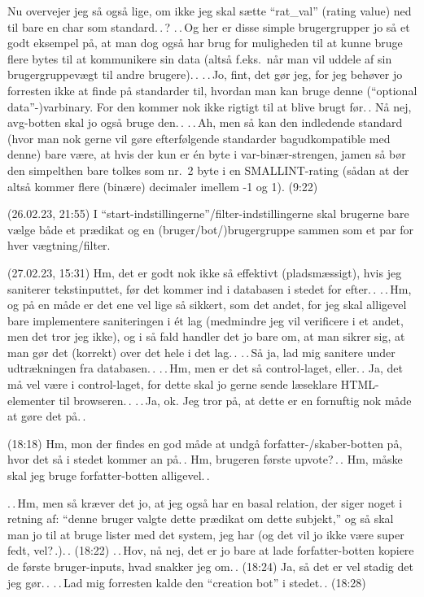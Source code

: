 \documentclass{report}
\begin{document}
Nu overvejer jeg så også lige, om ikke jeg skal sætte ``rat\_val'' (rating value) ned til bare en char som standard.\,.\,? .\,.\,Og her er disse simple brugergrupper jo så et godt eksempel på, at man dog også har brug for muligheden til at kunne bruge flere bytes til at kommunikere sin data (altså f.eks.\ når man vil uddele af sin brugergruppevægt til andre brugere).\,. .\,.\,Jo, fint, det gør jeg, for jeg behøver jo forresten ikke at finde på standarder til, hvordan man kan bruge denne (``optional data''-)varbinary. For den kommer nok ikke rigtigt til at blive brugt før.\,. Nå nej, avg-botten skal jo også bruge den.\,. .\,.\,Ah, men så kan den indledende standard (hvor man nok gerne vil gøre efterfølgende standarder bagudkompatible med denne) bare være, at hvis der kun er én byte i var-binær-strengen, jamen så bør den simpelthen bare tolkes som nr.\ 2 byte i en SMALLINT-rating (sådan at der altså kommer flere (binære) decimaler imellem -1 og 1). (9:22) 

(26.02.23, 21:55) I ``start-indstillingerne''/filter-indstillingerne skal brugerne bare vælge både et prædikat og en (bruger/bot/)brugergruppe sammen som et par for hver vægtning/filter. 

(27.02.23, 15:31) Hm, det er godt nok ikke så effektivt (pladsmæssigt), hvis jeg saniterer tekstinputtet, før det kommer ind i databasen i stedet for efter.\,. .\,.\,Hm, og på en måde er det ene vel lige så sikkert, som det andet, for jeg skal alligevel bare implementere saniteringen i ét lag (medmindre jeg vil verificere i et andet, men det tror jeg ikke), og i så fald handler det jo bare om, at man sikrer sig, at man gør det (korrekt) over det hele i det lag.\,. .\,.\,Så ja, lad mig sanitere under udtrækningen fra databasen.\,. .\,.\,Hm, men er det så control-laget, eller.\,. Ja, det må vel være i control-laget, for dette skal jo gerne sende læseklare HTML-elementer til browseren.\,. 
.\,.\,Ja, ok. Jeg tror på, at dette er en fornuftig nok måde at gøre det på.\,.  

(18:18) Hm, mon der findes en god måde at undgå forfatter-/skaber-botten på, hvor det så i stedet kommer an på.\,. Hm, brugeren første upvote?\,.\,. Hm, måske skal jeg bruge forfatter-botten alligevel.\,. 

.\,.\,Hm, men så kræver det jo, at jeg også har en basal relation, der siger noget i retning af: ``denne bruger valgte dette prædikat om dette subjekt,'' og så skal man jo til at bruge lister med det system, jeg har (og det vil jo ikke være super fedt, vel?\,.).\,. (18:22) .\,.\,Hov, nå nej, det er jo bare at lade forfatter-botten kopiere de første bruger-inputs, hvad snakker jeg om.\,. (18:24) Ja, så det er vel stadig det jeg gør.\,. .\,.\,Lad mig forresten kalde den ``creation bot'' i stedet.\,. (18:28)
\end{document}
